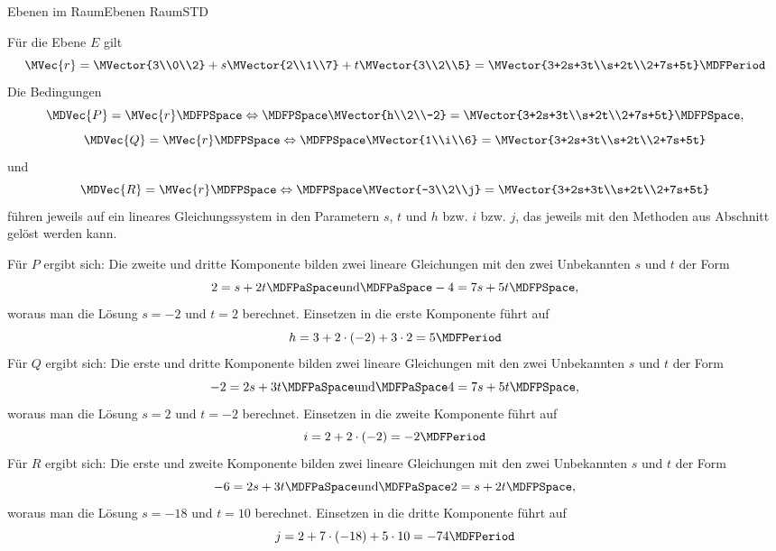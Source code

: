 \begin{MXContent}{Ebenen im Raum}{Ebenen Raum}{STD}
\begin{MExercise}
\begin{MHint}{\iSolution}
Für die Ebene $E$ gilt
\[
 \MVec{r}=\MVector{3\\0\\2}+s\MVector{2\\1\\7}+t\MVector{3\\2\\5}=\MVector{3+2s+3t\\s+2t\\2+7s+5t} \MDFPeriod
\]
Die Bedingungen 
\[
 \MDVec{P}=\MVec{r}\MDFPSpace\Leftrightarrow\MDFPSpace\MVector{h\\2\\-2}=\MVector{3+2s+3t\\s+2t\\2+7s+5t} \MDFPSpace,
\]
\[
 \MDVec{Q}=\MVec{r}\MDFPSpace\Leftrightarrow\MDFPSpace\MVector{1\\i\\6}=\MVector{3+2s+3t\\s+2t\\2+7s+5t}
\]
und
\[
 \MDVec{R}=\MVec{r}\MDFPSpace\Leftrightarrow\MDFPSpace\MVector{-3\\2\\j}=\MVector{3+2s+3t\\s+2t\\2+7s+5t}
\]
führen jeweils auf ein lineares Gleichungssystem in den Parametern $s$, $t$ und $h$ bzw. $i$ bzw. $j$, das jeweils mit den Methoden aus Abschnitt  gelöst werden kann.

Für $P$ ergibt sich: Die zweite und dritte Komponente bilden zwei lineare Gleichungen mit den zwei Unbekannten $s$ und $t$ der Form
\[
 2=s+2t\MDFPaSpace\textrm{und}\MDFPaSpace -4=7s+5t \MDFPSpace,
\]
woraus man die Lösung $s=-2$ und $t=2$ berechnet. Einsetzen in die erste Komponente führt auf
\[
 h=3+2\cdot(-2)+3\cdot 2=5 \MDFPeriod
\]
Für $Q$ ergibt sich: Die erste und dritte Komponente bilden zwei lineare Gleichungen mit den zwei Unbekannten $s$ und $t$ der Form
\[
 -2=2s+3t\MDFPaSpace\textrm{und}\MDFPaSpace 4=7s+5t \MDFPSpace,
\]
woraus man die Lösung $s=2$ und $t=-2$ berechnet. Einsetzen in die zweite Komponente führt auf
\[
 i=2+2\cdot(-2)=-2 \MDFPeriod
\]
Für $R$ ergibt sich: Die erste und zweite Komponente bilden zwei lineare Gleichungen mit den zwei Unbekannten $s$ und $t$ der Form
\[
 -6=2s+3t\MDFPaSpace\textrm{und}\MDFPaSpace 2=s+2t \MDFPSpace,
\]
woraus man die Lösung $s=-18$ und $t=10$ berechnet. Einsetzen in die dritte Komponente führt auf
\[
 j=2+7\cdot(-18)+5\cdot10=-74 \MDFPeriod
\]
\end{MHint}

\end{MExercise}

\end{MXContent}

